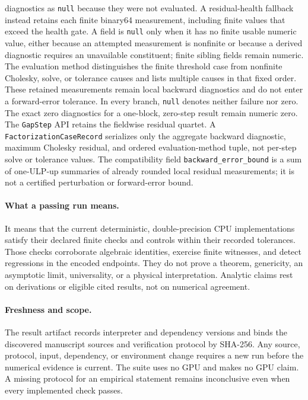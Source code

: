 diagnostics as \texttt{null} because they were not evaluated.  A
residual-health fallback instead retains each finite binary64 measurement,
including finite values that exceed the health gate.  A field is
\texttt{null} only when it has no finite usable numeric value, either because
an attempted measurement is nonfinite or because a derived diagnostic requires
an unavailable constituent; finite sibling fields remain numeric.  The
evaluation method distinguishes the finite threshold case from nonfinite
Cholesky, solve, or tolerance causes and lists multiple causes in that fixed
order.  These retained measurements remain local backward diagnostics and do
not enter a forward-error tolerance.  In every branch, \texttt{null} denotes
neither failure nor zero.  The exact zero diagnostics for a one-block,
zero-step result remain numeric zero.  The \texttt{GapStep} API retains the
fieldwise residual quartet.  A \texttt{FactorizationCaseRecord} serializes only
the aggregate backward diagnostic, maximum Cholesky residual, and ordered
evaluation-method tuple, not per-step solve or tolerance values.  The
compatibility field \texttt{backward\_error\_bound} is a sum of one-ULP-up
summaries of already rounded local residual measurements; it is not a
certified perturbation or forward-error bound. 

\paragraph{What a passing run means.}
It means that the current deterministic, double-precision CPU
implementations satisfy their declared finite checks and controls within
their recorded tolerances.  Those checks corroborate algebraic identities,
exercise finite witnesses, and detect regressions in the encoded endpoints.
They do not prove a theorem, genericity, an asymptotic limit, universality,
or a physical interpretation.  Analytic claims rest on derivations or
eligible cited results, not on numerical agreement.

\paragraph{Freshness and scope.}
The result artifact records interpreter and dependency versions and binds
the discovered manuscript sources and verification protocol by SHA-256.
Any source, protocol, input, dependency, or environment change requires a
new run before the numerical evidence is current.  The suite uses no GPU and
makes no GPU claim.  A missing protocol for an empirical statement remains
inconclusive even when every implemented check passes.

